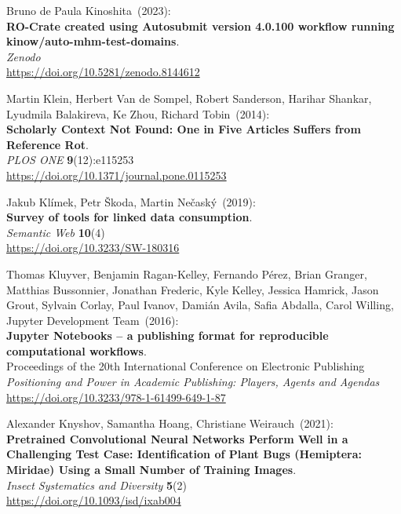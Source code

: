 \begin{thebibliography}{9}
Bruno de Paula Kinoshita~(2023): \\
\textbf{RO-Crate created using Autosubmit version 4.0.100 workflow running kinow/auto-mhm-test-domains}.\\
\emph{Zenodo}\\
\url{https://doi.org/10.5281/zenodo.8144612}

Martin Klein, Herbert Van de Sompel, Robert Sanderson, Harihar Shankar,
Lyudmila Balakireva, Ke Zhou, Richard Tobin~(2014): \\
\textbf{Scholarly Context Not Found: One in Five Articles Suffers from Reference Rot}.\\
\emph{PLOS ONE} \textbf{9}(12):e115253\\
\url{https://doi.org/10.1371/journal.pone.0115253}

Jakub Klímek, Petr Škoda, Martin Nečaský~(2019): \\
\textbf{Survey of tools for linked data consumption}. \\
\emph{Semantic Web} \textbf{10}(4) \\
\url{https://doi.org/10.3233/SW-180316}

Thomas Kluyver, Benjamin Ragan-Kelley, Fernando Pérez, Brian Granger, Matthias Bussonnier, Jonathan Frederic, Kyle Kelley, Jessica Hamrick, Jason Grout, Sylvain Corlay, Paul Ivanov, Damián Avila, Safia Abdalla, Carol Willing, Jupyter Development Team~(2016): \\
\textbf{Jupyter Notebooks – a publishing format for reproducible computational workflows}.\\
Proceedings of the 20th International Conference on Electronic Publishing\\
\emph{Positioning and Power in Academic Publishing: Players, Agents and Agendas}\\ 
\url{https://doi.org/10.3233/978-1-61499-649-1-87}

Alexander Knyshov, Samantha Hoang, Christiane Weirauch~(2021): \\
\textbf{Pretrained Convolutional Neural Networks Perform Well in a Challenging Test Case:
Identification of Plant Bugs (Hemiptera: Miridae) Using a Small Number
of Training Images}. \\
\emph{Insect Systematics and Diversity} \textbf{5}(2)\\
\url{https://doi.org/10.1093/isd/ixab004}


\end{thebibliography}
